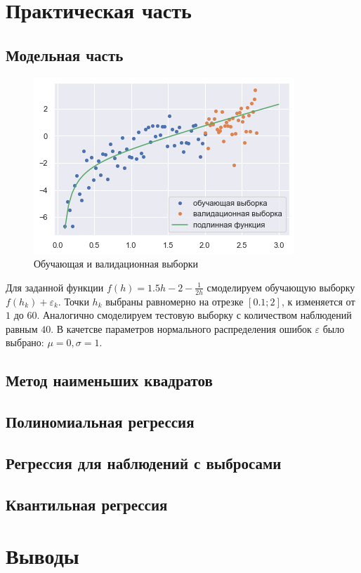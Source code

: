 \documentclass[a4paper,12pt]{article}
\begin{document}
\section{Практическая часть}

\subsection{Модельная часть}

\begin{figure} 
    \vspace{-4ex}
    \includegraphics[width=\linewidth]{src/img/сгенерированная_выборка.png}
    \caption{Обучающая и валидационная выборки}
\end{figure}

Для заданной функции $f(h) = 1.5h - 2 - \frac{1}{2h}$ смоделируем обучающую выборку $f(h_k) + \varepsilon_k$. Точки $h_k$ выбраны равномерно на отрезке $[0.1;2]$, $к$ изменяется от $1$ до $60$. Аналогично смоделируем тестовую выборку с количеством наблюдений равным $40$. В качетсве параметров нормального распределения ошибок $\varepsilon$ было выбрано: $\mu=0, \sigma = 1$.

\subsection{Метод наименьших квадратов}




\subsection{Полиномиальная регрессия}

\subsection{Регрессия для наблюдений с выбросами}

\subsection{Квантильная регрессия}



\section{Выводы}
\end{document}
